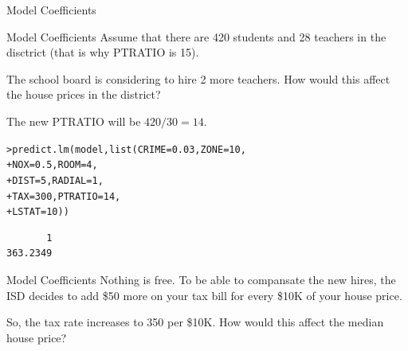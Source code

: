 \documentclass{beamer}\usepackage[]{graphicx}\usepackage[]{color}
\makeatletter
\newcommand{\hlnum}[1]{\textcolor[rgb]{0.824,0.412,0.118}{#1}}%
\newcommand{\hlstd}[1]{\textcolor[rgb]{1,0.894,0.769}{#1}}%
\newcommand{\hlkwc}[1]{\textcolor[rgb]{0.78,0.941,0.545}{#1}}%
\newcommand{\hlkwd}[1]{\textcolor[rgb]{1,0.78,0.769}{#1}}%
\newenvironment{kframe}{%
 \def\at@end@of@kframe{}%
 \ifinner\ifhmode%
  \def\at@end@of@kframe{\end{minipage}}%
  \begin{minipage}{\columnwidth}%
 \fi\fi%
 \def\FrameCommand##1{\hskip\@totalleftmargin \hskip-\fboxsep
 \colorbox{shadecolor}{##1}\hskip-\fboxsep
     \hskip-\linewidth \hskip-\@totalleftmargin \hskip\columnwidth}%
 \MakeFramed {\advance\hsize-\width
   \@totalleftmargin\z@ \linewidth\hsize
   \@setminipage}}%
 {\par\unskip\endMakeFramed%
 \at@end@of@kframe}
\newenvironment{knitrout}{}{} %
\makeatother
\begin{document}
\begin{darkframes}
\begin{frame}[fragile]{Model Coefficients}
    \end{frame}
    
    
    \begin{frame}[fragile]{Model Coefficients}
      Assume that there are 420 students and 28 teachers in the disctrict (that is why PTRATIO is 15). \pause
      
      \bigskip
      
      The school board is considering to hire 2 more teachers. How would this affect the house prices in the district? \pause
      
      \bigskip
      
      The new PTRATIO will be $420/30=14$. \pause
      
\begin{knitrout}
\begin{kframe}
\begin{alltt}
\hlstd{> }\hlkwd{predict.lm}\hlstd{(model,} \hlkwd{list}\hlstd{(}\hlkwc{CRIME}\hlstd{=}\hlnum{0.03}\hlstd{,} \hlkwc{ZONE}\hlstd{=}\hlnum{10}\hlstd{,}
\hlstd{+ }                       \hlkwc{NOX}\hlstd{=}\hlnum{0.5}\hlstd{,} \hlkwc{ROOM}\hlstd{=}\hlnum{4}\hlstd{,}
\hlstd{+ }                       \hlkwc{DIST}\hlstd{=}\hlnum{5}\hlstd{,}  \hlkwc{RADIAL}\hlstd{=}\hlnum{1}\hlstd{,}
\hlstd{+ }                       \hlkwc{TAX}\hlstd{=}\hlnum{300}\hlstd{,} \hlkwc{PTRATIO}\hlstd{=}\hlnum{14}\hlstd{,}
\hlstd{+ }                       \hlkwc{LSTAT}\hlstd{=}\hlnum{10}\hlstd{))}
\end{alltt}
\begin{verbatim}
       1 
363.2349 
\end{verbatim}
\end{kframe}
\end{knitrout}
    \end{frame}
    
    
    
    \begin{frame}[fragile]{Model Coefficients}
      Nothing is free. To be able to compansate the new hires, the ISD decides to add \$50 more on your tax bill for every \$10K of your house price. \pause
      
      \bigskip
      So, the tax rate increases to 350 per \$10K. How would this affect the median house price?
      
      \lc
    
    \end{frame}
    
    
    

\end{darkframes}
\end{document}
